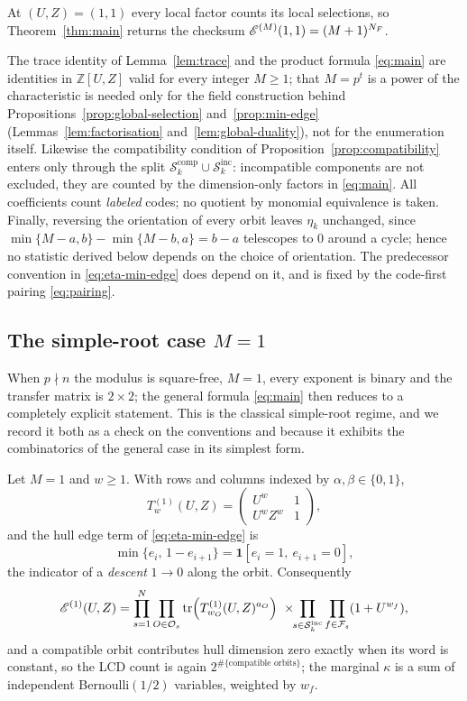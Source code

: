At $(U,Z)=(1,1)$ every local factor counts its local selections, so
Theorem~\ref{thm:main} returns the checksum
$\mathscr E^{(M)}(1,1)=(M+1)^{N_F}$.

\begin{remark}
\label{rem:hypotheses}
The trace identity of Lemma~\ref{lem:trace} and the product formula
\eqref{eq:main} are identities in $\mathbb{Z}[U,Z]$ valid for every integer
$M\geq1$; that $M=p^t$ is a power of the characteristic is needed only for the
field construction behind Propositions~\ref{prop:global-selection}
and~\ref{prop:min-edge} (Lemmas~\ref{lem:factorisation}
and~\ref{lem:global-duality}), not for the enumeration itself. Likewise the
compatibility condition of Proposition~\ref{prop:compatibility} enters only
through the split $\mathcal{S}_k^{\mathrm{comp}}\cup\mathcal{S}_k^{\mathrm{inc}}$:
incompatible components are not excluded, they are counted by the
dimension-only factors in \eqref{eq:main}. All coefficients count \emph{labeled}
codes; no quotient by monomial equivalence is taken. Finally, reversing the
orientation of every orbit leaves $\eta_k$ unchanged, since
$\min\{M-a,b\}-\min\{M-b,a\}=b-a$ telescopes to $0$ around a cycle; hence no
statistic derived below depends on the choice of orientation. The predecessor
convention in \eqref{eq:eta-min-edge} does depend on it, and is fixed by the
code-first pairing \eqref{eq:pairing}.
\end{remark}

\subsection{The simple-root case \texorpdfstring{$M=1$}{M=1}}\label{sec:M1}

When $p\nmid n$ the modulus is square-free, $M=1$, every exponent is binary and
the transfer matrix is $2\times2$; the general formula
\eqref{eq:main} then reduces to a completely explicit statement. This is the
classical simple-root regime, and we record it both as a check on the
conventions and because it exhibits the combinatorics of the general case in
its simplest form.

\begin{proposition}\label{prop:M1}
Let $M=1$ and $w\geq1$. With rows and columns indexed by $\alpha,\beta\in\{0,1\}$,
\[
T^{(1)}_w(U,Z)=
\begin{pmatrix}
U^{w} & 1\\[2pt]
U^{w}Z^{w} & 1
\end{pmatrix},
\]
and the hull edge term of \eqref{eq:eta-min-edge} is
\[
\min\{e_i,\,1-e_{i+1}\}=\mathbf{1}[e_i=1,\ e_{i+1}=0],
\]
the indicator of a \emph{descent} $1\to0$ along the orbit. Consequently
\[
\Epoly^{(1)}(U,Z)
=\prod_{s=1}^{N}\prod_{O\in\Os}\operatorname{tr}
 \Bigl(T^{(1)}_{w_O}(U,Z)^{a_O}\Bigr)
\ \times\!\!\prod_{s\in\mathcal{S}_k^{\mathrm{inc}}}\prod_{f\in\Fs}(1+U^{w_f}),
\]
and a compatible orbit contributes hull dimension zero exactly when its word is
constant, so the LCD count is again $2^{\#\{\text{compatible orbits}\}}$; the
marginal $\kappa$ is a sum of independent Bernoulli$(1/2)$ variables, weighted
by $w_f$.
\end{proposition}


